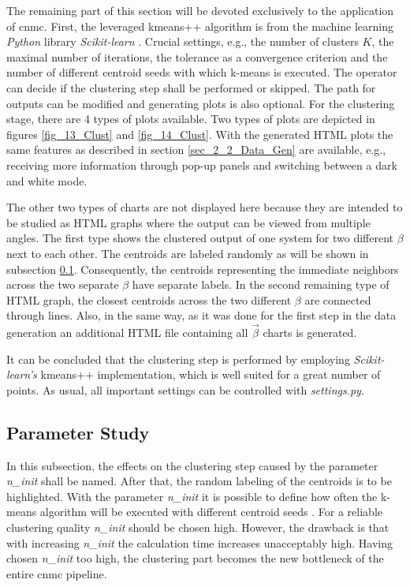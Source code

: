 The remaining part of this section will be devoted exclusively to the application of \gls{cnmc}. First, the leveraged kmeans++ algorithm is from the machine learning \emph{Python} library \emph{Scikit-learn} \cite{scikit-learn}. 
Crucial settings, e.g., the number of clusters $K$, the maximal number of iterations, the tolerance as a convergence criterion and the number of different centroid seeds with which k-means is executed.
The operator can decide if the clustering step shall be performed or skipped.
The path for outputs can be modified and generating plots is also optional.
For the clustering stage, there are 4 types of plots available. 
Two types of plots are depicted in figures \ref{fig_13_Clust} and \ref{fig_14_Clust}.
With the generated HTML plots the same features as described in section \ref{sec_2_2_Data_Gen} are available, e.g., receiving more information through pop-up panels and
switching between a dark and white mode. 
 \newline 

The other two types of charts are not displayed here because they are intended to be studied as HTML graphs where the output can be viewed from multiple angles.
The first type shows the clustered output of one system for two different $\beta$ next to each other. 
The centroids are labeled randomly as will be shown in subsection \ref{subsec_2_2_1_Parameter_Study}. 
Consequently, the centroids representing the immediate neighbors across the two separate $\beta $ have separate labels. 
In the second remaining type of HTML graph, the closest centroids across the two different $\beta $  are connected through lines.
Also, in the same way, as it was done for the first step in the data generation an additional HTML file containing all $\vec{\beta } $ charts is generated.
\newline

It can be concluded that the clustering step is performed by employing \emph{Scikit-learn's} kmeans++ implementation, which is well suited for a great number of points. As usual, all important settings can be controlled with \emph{settings.py}.

\subsection{Parameter Study}
\label{subsec_2_2_1_Parameter_Study}
In this subsection, the effects on the clustering step caused by the parameter \emph{n\_init} shall be named. After that, the random labeling of the centroids is to be highlighted.
With the parameter \emph{n\_init} it is possible to define how often the k-means algorithm will be executed with different centroid seeds \cite{scikit-learn}.
For a reliable clustering quality \emph{n\_init} should be chosen high. However, the drawback is that with increasing \emph{n\_init} the calculation time increases unacceptably high. Having chosen \emph{n\_init} too high, the clustering part becomes the new bottleneck of the entire \gls{cnmc} pipeline. \newline

